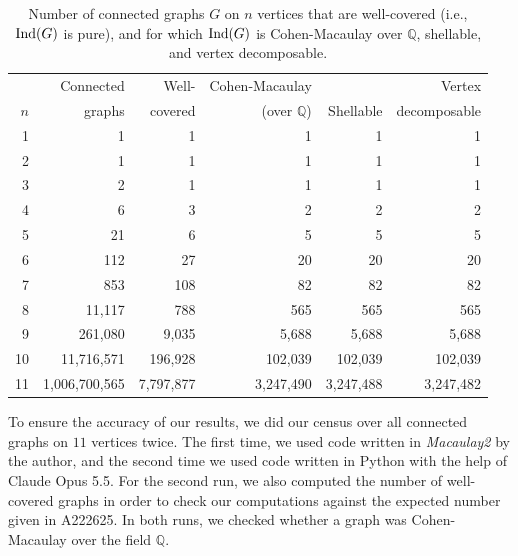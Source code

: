 \documentclass[12pt]{amsart}
\theoremstyle{plain}
\theoremstyle{definition}
\theoremstyle{remark}
\numberwithin{equation}{section}
\numberwithin{equation}{section}
\begin{document}
\begin{table}[ht]
\centering
\begin{tabular}{@{}rrrrrr@{}}
\toprule
    & Connected & Well-     & Cohen-Macaulay      &           & Vertex        \\
$n$ & graphs    & covered   & (over $\mathbb{Q}$) & Shellable & decomposable  \\
\midrule
 1 &             1 &         1 &         1 &         1 &         1 \\
 2 &             1 &         1 &         1 &         1 &         1 \\
 3 &             2 &         1 &         1 &         1 &         1 \\
 4 &             6 &         3 &         2 &         2 &         2 \\
 5 &            21 &         6 &         5 &         5 &         5 \\
 6 &           112 &        27 &        20 &        20 &        20 \\
 7 &           853 &       108 &        82 &        82 &        82 \\
 8 &        11,117 &       788 &       565 &       565 &       565 \\
 9 &       261,080 &     9,035 &     5,688 &     5,688 &     5,688 \\
10 &    11,716,571 &   196,928 &   102,039 &   102,039 &   102,039 \\
\midrule
11 & 1,006,700,565 & 7,797,877 & 3,247,490 & 3,247,488 & 3,247,482 \\
\bottomrule
\end{tabular}
\caption{Number of connected graphs $G$ on $n$ vertices that are
well-covered (i.e., ${\rm Ind}(G)$ is pure), and for which ${\rm Ind}(G)$
is Cohen-Macaulay over $\mathbb{Q}$, shellable, and vertex decomposable.}\label{table}
\end{table}
 


To ensure the accuracy of our results, we did our census over all
connected graphs
on $11$ vertices twice. The first time, we used code 
written in {\it Macaulay2} \cite{M2} by the author, and the second
time we used code written in Python with the help of Claude Opus 5.5.  For the
second run, we also computed the number of well-covered graphs in
order to check our computations against the expected number given in
A222625.  In both runs, we checked whether a graph was Cohen-Macaulay over 
the field $\mathbb{Q}$.
\end{document}
